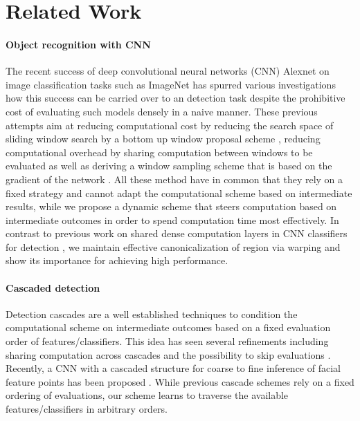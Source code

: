 \section{Related Work}\label{sec:related}

\paragraph{Object recognition with CNN}\label{object-recognition-with-cnn}
The recent success of deep convolutional neural networks (CNN) Alexnet \cite{Krizhevsky-NIPS-2012} on image classification tasks such as ImageNet \cite{deng2009cvpr} has spurred various investigations \cite{Girshick-CVPR-2014,Zou-CVPR-2014,Simonyan-ICLR-2014,Sermanet-ICLR-2014} how this success can be carried over to an detection task despite the prohibitive cost of evaluating such models densely in a naive manner. These previous attempts aim at reducing computational cost by reducing the search space of sliding window search by a bottom up window proposal scheme \cite{Girshick-CVPR-2014}, reducing computational overhead by sharing computation between windows to be evaluated \cite{Zou-CVPR-2014,Sermanet-ICLR-2014} as well as deriving a window sampling scheme that is based on the gradient of the network \cite{Simonyan-ICLR-2014}. All these method have in common that they rely on a fixed strategy and cannot adapt the computational scheme based on intermediate results, while we propose a dynamic scheme that steers computation based on intermediate outcomes in order to spend computation time most effectively. In contrast to previous work on shared dense computation layers in CNN classifiers for detection \cite{Sermanet-ICLR-2014}, we maintain effective canonicalization of region via warping and show its importance for achieving high performance.

\paragraph{Cascaded detection}\label{cascaded-detection}
Detection cascades \cite{Viola2004,Felzenszwalb-CVPR-2010} are a well established techniques to condition the computational scheme on intermediate outcomes based on a fixed evaluation order of features/classifiers. This idea has seen several refinements including sharing computation across cascades \cite{Dollar-ECCV-2012} and the possibility to skip evaluations \cite{benbouzid12icml}. Recently, a CNN with a cascaded structure for coarse to fine inference of facial feature points has been proposed \cite{cnn_cascade}. While previous cascade schemes rely on a fixed ordering of evaluations, our scheme learns to traverse the available features/classifiers in arbitrary orders.

